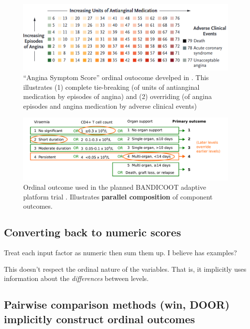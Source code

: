 \documentclass[
  11pt,
  fleqn
]{article}
\begin{document}
\begin{figure}
  \includegraphics[width=6in]{rajkumar_et_al_outcome.png}
  \caption{``Angina Symptom Score'' ordinal outocome develped in
    \citep{rajkumarPlaceboControlledTrialPercutaneous2023}. This illustrates
    (1) complete tie-breaking (of units of antianginal medication by
    episodes of angina) and (2) overriding (of angina episodes and
  angina medication by adverse clinical events)}
  \label{fig:rajkumar_et_al_outcome}
\end{figure}

\begin{figure}
  \includegraphics[width=7in]{parallel_composition_bandicoot.pdf}
  \caption{Ordinal outcome used in the planned BANDICOOT adaptive
    platform trial \citep{walkerCodesigningNovelOrdinal2025}.
  Illustrates \textbf{parallel composition} of component outcomes.}
  \label{fig:parallel_bandicoot}
\end{figure}

\subsection{Converting back to numeric scores}

Treat each input factor as
numeric then sum them up. I believe \citet{ongUnlockingDOORHow2023}
has examples?

This doesn't respect the ordinal nature of the variables. That is, it
implicitly uses information about the \emph{differences} between levels.

\subsection{Pairwise comparison methods (win, DOOR) implicitly construct ordinal
outcomes}
\end{document}
